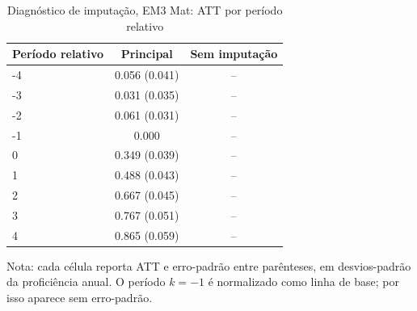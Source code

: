 \begin{table}[!htbp]
\centering
\caption{Diagnóstico de imputação, EM3 Mat: ATT por período relativo}
\label{tab:ap_event_imputacao_em3_mat}
\vspace{-0.15cm}
\scriptsize
\setlength{\tabcolsep}{4pt}
\renewcommand{\arraystretch}{0.92}
\begin{tabular}{lcc}
\toprule
Período relativo & Principal & Sem imputação \\
\midrule
-4 & 0.056 (0.041) & -- \\
-3 & 0.031 (0.035) & -- \\
-2 & 0.061 (0.031) & -- \\
-1 & 0.000 & -- \\
0 & 0.349 (0.039) & -- \\
1 & 0.488 (0.043) & -- \\
2 & 0.667 (0.045) & -- \\
3 & 0.767 (0.051) & -- \\
4 & 0.865 (0.059) & -- \\
\bottomrule
\end{tabular}
\begin{flushleft}
\footnotesize Nota: cada célula reporta ATT e erro-padrão entre parênteses, em desvios-padrão da proficiência anual. O período \(k=-1\) é normalizado como linha de base; por isso aparece sem erro-padrão.
\end{flushleft}
\end{table}

